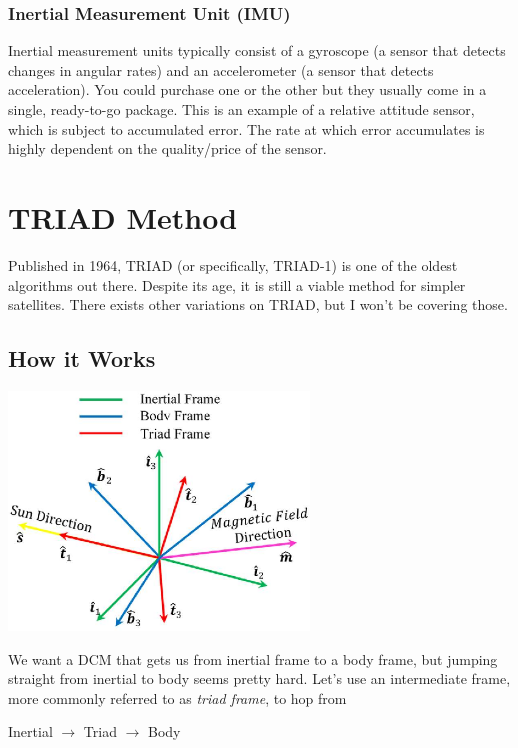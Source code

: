 \documentclass[a4paper,14pt]{extreport}
\begin{document}
\subsection{Inertial Measurement Unit (IMU)}
Inertial measurement units typically consist of a gyroscope (a sensor that detects changes in angular rates) and an accelerometer (a sensor that detects acceleration). You could purchase one or the other but they usually come in a single, ready-to-go package. This is an example of a relative attitude sensor, which is subject to accumulated error. The rate at which error accumulates is highly dependent on the quality/price of the sensor.
\chapter{TRIAD Method}
Published in 1964, TRIAD (or specifically, TRIAD-1) is one of the oldest algorithms out there. Despite its age, it is still a viable method for simpler satellites. There exists other variations on TRIAD, but I won't be covering those.

\section{How it Works}
\begin{center}
\includegraphics[width=8cm]{triad}
\end{center}
We want a DCM that gets us from inertial frame to a body frame, but jumping straight from inertial to body seems pretty hard. Let's use an intermediate frame, more commonly referred to as \emph{triad frame}, to hop from 
\begin{center}Inertial $\rightarrow$ Triad $\rightarrow$ Body\end{center}
\end{document}
